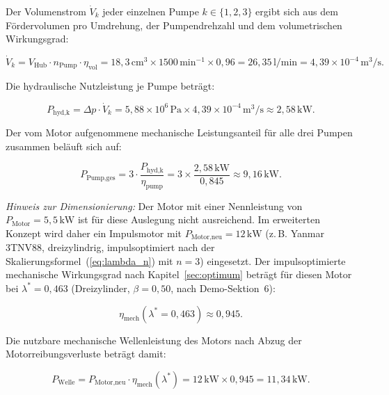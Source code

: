 ﻿\documentclass[a4paper,12pt]{article}
\begin{document}
Der Volumenstrom $\dot{V}_k$ jeder einzelnen Pumpe $k \in \{1,2,3\}$ ergibt sich
aus dem Fördervolumen pro Umdrehung, der Pumpendrehzahl und dem volumetrischen
Wirkungsgrad:

\begin{equation}
  \dot{V}_k = V_\text{Hub} \cdot n_\text{Pump} \cdot \eta_\text{vol}
            = 18{,}3\,\text{cm}^3 \times 1500\,\text{min}^{-1} \times 0{,}96
            = 26{,}35\,\text{l/min}
            = 4{,}39 \times 10^{-4}\,\text{m}^3/\text{s}.
  \label{eq:V_pump}
\end{equation}

Die hydraulische Nutzleistung je Pumpe beträgt:

\begin{equation}
  P_\text{hyd,k} = \Delta p \cdot \dot{V}_k
                 = 5{,}88 \times 10^6\,\text{Pa}
                   \times 4{,}39 \times 10^{-4}\,\text{m}^3/\text{s}
                 \approx 2{,}58\,\text{kW}.
  \label{eq:P_hyd}
\end{equation}

Der vom Motor aufgenommene mechanische Leistungsanteil für alle drei Pumpen
zusammen beläuft sich auf:

\begin{equation}
  P_\text{Pump,ges} = 3 \cdot \frac{P_\text{hyd,k}}{\eta_\text{pump}}
                    = 3 \times \frac{2{,}58\,\text{kW}}{0{,}845}
                    \approx 9{,}16\,\text{kW}.
  \label{eq:P_pump_ges}
\end{equation}

\textit{Hinweis zur Dimensionierung:} Der Motor mit einer Nennleistung von
$P_\text{Motor} = 5{,}5\,\text{kW}$ ist für diese Auslegung nicht ausreichend.
Im erweiterten Konzept wird daher ein Impulsmotor mit
$P_\text{Motor,neu} = 12\,\text{kW}$ (z.\,B. Yanmar 3TNV88, dreizylindrig,
impulsoptimiert nach der Skalierungsformel~(\ref{eq:lambda_n}) mit $n=3$)
eingesetzt. Der impulsoptimierte mechanische Wirkungsgrad nach
Kapitel~\ref{sec:optimum} beträgt für diesen Motor bei $\lambda^* = 0{,}463$
(Dreizylinder, $\beta = 0{,}50$, nach Demo-Sektion~6):

\begin{equation}
  \eta_\text{mech}(\lambda^* = 0{,}463) \approx 0{,}945.
  \label{eq:eta_mech_12kw}
\end{equation}

Die nutzbare mechanische Wellenleistung des Motors nach Abzug der
Motorreibungsverluste beträgt damit:

\begin{equation}
  P_\text{Welle} = P_\text{Motor,neu} \cdot \eta_\text{mech}(\lambda^*)
                 = 12\,\text{kW} \times 0{,}945
                 = 11{,}34\,\text{kW}.
  \label{eq:P_welle}
\end{equation}
\end{document}
